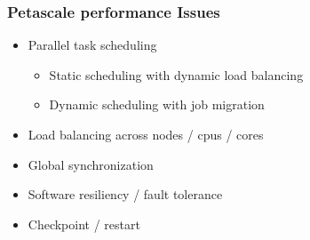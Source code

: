\begin{frame}[fragile] \frametitle{Petascale performance Issues}
   \begin{itemize}
      \item {}Parallel task scheduling
      \begin{itemize}
          \item {}Static scheduling with dynamic load balancing
          \item {}Dynamic scheduling with job migration
      \end{itemize}
      \item {}Load balancing across nodes / cpus / cores
      \item {}Global synchronization
      \item {}Software resiliency / fault tolerance
      \item {}Checkpoint / restart
   \end{itemize}
\end{frame}
